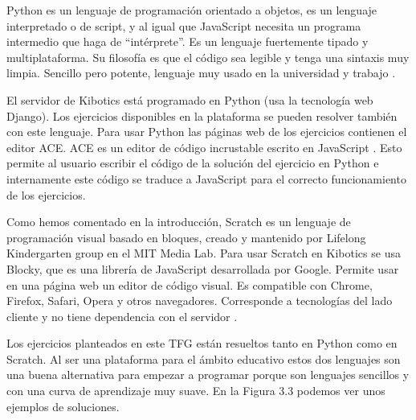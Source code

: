 Python es un lenguaje de programación orientado a objetos, es un lenguaje interpretado o de script, y al igual que JavaScript necesita un programa intermedio que haga de ``intérprete''. Es un lenguaje fuertemente tipado y multiplataforma. Su filosofía es que el código sea legible y tenga  una sintaxis muy limpia. Sencillo pero potente, lenguaje muy usado en la universidad y trabajo \cite{python}.

El servidor de Kibotics está programado en Python (usa la tecnología web Django). Los ejercicios disponibles en la plataforma se pueden resolver también con este lenguaje. Para usar Python las páginas web de los ejercicios contienen el editor ACE. ACE es un editor de código incrustable escrito en JavaScript \cite{aceeditor}. Esto permite al usuario escribir el código de la solución del ejercicio en Python e internamente este código se traduce a JavaScript para el correcto funcionamiento de los ejercicios. 

Como hemos comentado en la introducción, Scratch es un lenguaje de programación visual basado en bloques, creado y mantenido por Lifelong Kindergarten group en el MIT Media Lab. Para usar Scratch en Kibotics se usa Blocky, que es una librería de JavaScript desarrollada por Google. Permite usar en una página web un editor de código visual. Es compatible con Chrome, Firefox, Safari, Opera y otros navegadores. Corresponde a tecnologías del lado cliente y no tiene dependencia con el servidor \cite{blocky}.


Los ejercicios planteados en este TFG están resueltos tanto en Python como en Scratch. Al ser una plataforma para el ámbito educativo estos dos lenguajes son una buena alternativa para empezar a programar porque son lenguajes sencillos y con una curva de aprendizaje muy suave. En la Figura 3.3 podemos ver unos ejemplos de soluciones.

